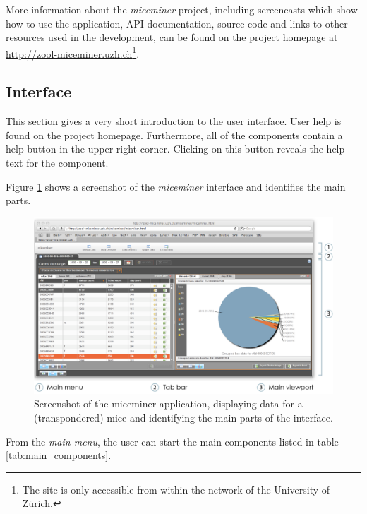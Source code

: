 More information about the \textit{miceminer} project, including screencasts which show how to use the application, \ac{API} documentation, source code and links to other resources used in the development, can be found on the project homepage at \href{http://zool-miceminer.uzh.ch/}{http://zool-miceminer.uzh.ch}\footnote{The site is only accessible from within the network of the University of Z\"urich.}. 

\subsection{Interface}
\label{subsec:miceminer_interface}

This section gives a very short introduction to the user interface. User help is found on the project homepage. Furthermore, all of the components contain a help button in the upper right corner. Clicking on this button reveals the help text for the component.

Figure \ref{fig:interface_overview} shows a screenshot of the \textit{miceminer} interface and identifies the main parts.

\begin{figure}[!ht]
\begin{center}
  \includegraphics[width=\textwidth]{assets/pdf/interface_overview.pdf}
  \caption[miceminer interface overview]{Screenshot of the miceminer application, displaying data for a (transpondered) mice and identifying the main parts of the interface.}
  \label{fig:interface_overview}
\end{center}
\end{figure}

From the \textit{main menu}, the user can start the main components listed in table \ref{tab:main_components}. 

